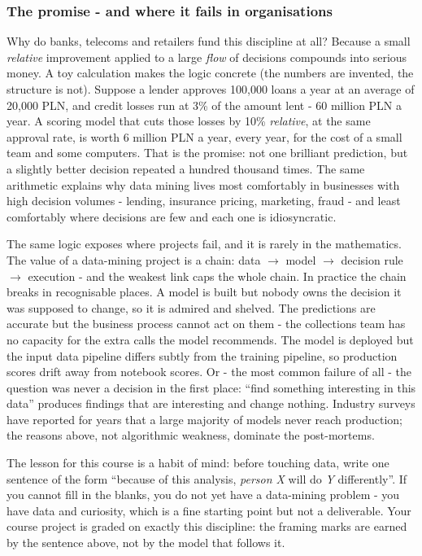 \documentclass[11pt,a4paper]{article}
\begin{document}
\subsubsection{The promise - and where it fails in organisations}
Why do banks, telecoms and retailers fund this discipline at all? Because a
small \emph{relative} improvement applied to a large \emph{flow} of
decisions compounds into serious money. A toy calculation makes the logic
concrete (the numbers are invented, the structure is not). Suppose a lender
approves 100{,}000 loans a year at an average of 20{,}000 PLN, and credit
losses run at 3\% of the amount lent - 60 million PLN a year. A scoring
model that cuts those losses by 10\% \emph{relative}, at the same approval
rate, is worth 6 million PLN a year, every year, for the cost of a small
team and some computers. That is the promise: not one brilliant prediction,
but a slightly better decision repeated a hundred thousand times. The same
arithmetic explains why data mining lives most comfortably in businesses
with high decision volumes - lending, insurance pricing, marketing,
fraud - and least comfortably where decisions are few and each one is
idiosyncratic.

The same logic exposes where projects fail, and it is rarely in the
mathematics. The value of a data-mining project is a chain: data
$\rightarrow$ model $\rightarrow$ decision rule $\rightarrow$ execution -
and the weakest link caps the whole chain. In practice the chain breaks in
recognisable places. A model is built but nobody owns the decision it was
supposed to change, so it is admired and shelved. The predictions are
accurate but the business process cannot act on them - the collections
team has no capacity for the extra calls the model recommends. The model is
deployed but the input data pipeline differs subtly from the training
pipeline, so production scores drift away from notebook scores. Or - the
most common failure of all - the question was never a decision in the
first place: ``find something interesting in this data'' produces findings
that are interesting and change nothing. Industry surveys have reported for
years that a large majority of models never reach production; the reasons
above, not algorithmic weakness, dominate the post-mortems.

The lesson for this course is a habit of mind: before touching data, write
one sentence of the form ``because of this analysis, \emph{person X} will
do \emph{Y} differently''. If you cannot fill in the blanks, you do not yet
have a data-mining problem - you have data and curiosity, which is a fine
starting point but not a deliverable. Your course project is graded on
exactly this discipline: the framing marks are earned by the sentence
above, not by the model that follows it.
\end{document}
